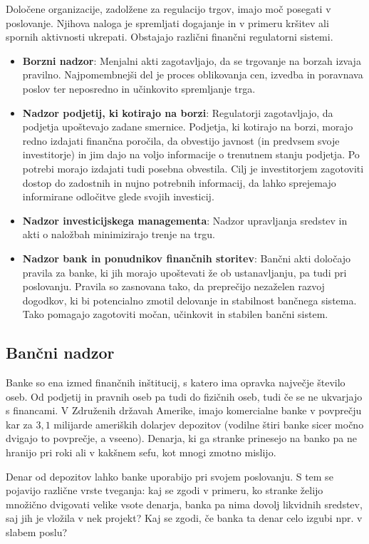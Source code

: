 \documentclass[12pt,a4paper]{amsart}
\theoremstyle{definition} %
\theoremstyle{plain} %
\begin{document}
Določene organizacije, zadolžene za regulacijo trgov, 
imajo moč posegati v poslovanje. Njihova naloga je spremljati dogajanje in
v primeru kršitev ali spornih aktivnosti ukrepati. Obstajajo različni finančni
regulatorni sistemi.
\begin{itemize}
  \item \textbf{Borzni nadzor}: Menjalni akti zagotavljajo, da se trgovanje na 
	borzah izvaja pravilno. Najpomembnejši del je proces oblikovanja cen, 
	izvedba in poravnava poslov ter neposredno in učinkovito spremljanje trga.
  \item \textbf{Nadzor podjetij, ki kotirajo na borzi}: Regulatorji zagotavljajo, da
	podjetja upoštevajo zadane smernice. Podjetja, ki kotirajo na borzi, morajo
	redno izdajati finančna poročila, da obvestijo javnost (in predvsem svoje
	investitorje) in jim dajo na voljo informacije o trenutnem stanju podjetja.
	Po potrebi morajo izdajati tudi posebna obvestila. Cilj je investitorjem 
	zagotoviti dostop do zadostnih in nujno potrebnih informacij, da lahko
	sprejemajo informirane odločitve glede svojih investicij.
  \item \textbf{Nadzor investicijskega managementa}: Nadzor upravljanja sredstev
	in akti o naložbah minimizirajo trenje na trgu.
  \item \textbf{Nadzor bank in ponudnikov finančnih storitev}: Bančni akti določajo 
	pravila za banke, ki jih morajo upoštevati že ob ustanavljanju, pa tudi pri 
	poslovanju. Pravila so zasnovana tako, da preprečijo nezaželen razvoj 
	dogodkov, ki bi potencialno zmotil delovanje in stabilnost bančnega sistema.
	Tako pomagajo zagotoviti močan, učinkovit in stabilen bančni sistem.
\end{itemize}


\subsection{Bančni nadzor}
Banke so ena izmed finančnih inštitucij, s katero ima opravka največje število oseb.
Od podjetij in pravnih oseb pa tudi do fizičnih oseb, tudi če se ne ukvarjajo s  
financami. V Združenih državah Amerike, imajo komercialne banke v povprečju 
kar za $3,1$ milijarde ameriških dolarjev depozitov (vodilne štiri banke sicer močno
dvigajo to povprečje, a vseeno). Denarja, ki ga stranke prinesejo na banko pa ne 
hranijo pri roki ali v kakšnem sefu, kot mnogi zmotno mislijo. 

Denar od depozitov lahko banke uporabijo pri svojem poslovanju. S tem se pojavijo 
različne vrste tveganja: kaj se zgodi v primeru, ko stranke želijo množično 
dvigovati velike vsote denarja, banka pa nima dovolj likvidnih sredstev, saj jih je 
vložila v nek projekt? Kaj se zgodi, če banka ta denar celo izgubi npr. v slabem poslu?
\end{document}
